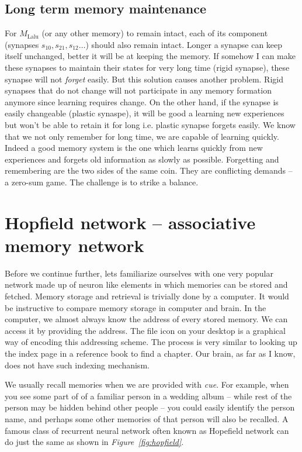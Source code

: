 \documentclass[]{resonance}
\newcommand\Fig[1]{\textit{Figure~\ref{#1}}}
\begin{document}
\subsection{Long term memory maintenance}{\label{subsec:ltp_maintenance} 

For $M_\text{Lalu}$ (or any other memory) to remain intact, each of its
component (synapses $s_{10}, s_{21}, s_{12} \ldots$) should also remain intact.
Longer a synapse can keep itself unchanged, better it will be at keeping the
memory. If somehow I can make these synapses to maintain their states for very
long time (rigid synapse), these synapse will not \emph{forget} easily. But this
solution causes another problem. Rigid synapses that do not change will not
participate in any memory formation anymore since learning requires change. On
the other hand, if the synapse is easily changeable (plastic synaspe), it will
be good a learning new experiences but won't be able to retain it for long i.e.
plastic synapse forgets easily. We know that we not only remember for long time,
we are capable of learning quickly.   Indeed a good memory system is the one which
learns quickly from new experiences and forgets old information as slowly as
possible.  Forgetting and remembering are the two sides of the same coin.  They
are conflicting demands -- a zero-sum game.  The challenge is to strike a
balance. 

\section{Hopfield network -- associative memory network}\label{sec:hopfield}

Before we continue further, lets familiarize ourselves with one very popular
network made up of neuron like elements in which memories can be stored and
fetched. Memory storage and retrieval is trivially done by a computer. It would
be instructive to compare memory storage in computer and brain. In the computer,
we almost always know the address of every stored memory.  We can access it by
providing the address. The file icon on your desktop is a graphical way of
encoding this addressing scheme. The process is very similar to looking up the
index page in a reference book to find a chapter. Our brain, as far as I know,
does not have such indexing mechanism. 

We usually recall memories when we are provided with \textit{cue}. For example,
when you see some part of of a familiar person in a wedding album -- while rest
of the person may be hidden behind other people -- you could easily identify the
person name, and perhaps some other memories of that person will also be
recalled. A famous class of recurrent neural network often known as Hopefield
network can do just the same as shown in \Fig{fig:hopfield}.

}
\end{document}
